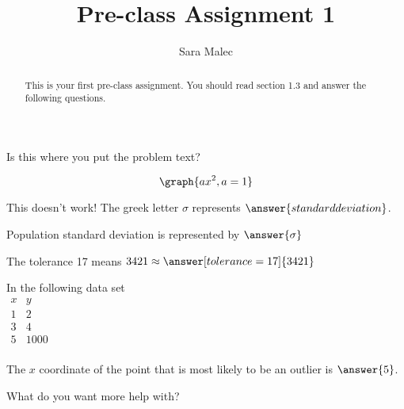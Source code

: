 \documentclass[handout]{ximera}
\title{Pre-class Assignment 1}
\author{Sara Malec}
\begin{document}
\begin{abstract}
  This is your first pre-class assignment. You should read section 1.3 and answer the following questions.
\end{abstract}
\maketitle


\begin{problem} Is this where you put the problem text?
\begin{multipleChoice}
\end{multipleChoice}
\end{problem}

\begin{problem}
   \[ 
   \graph{ax^2, a=1}
   \]
\end{problem}

\begin{problem}
    This doesn't work! The greek letter $\sigma$ represents $\answer{standard deviation}$.
\end{problem}

\begin{problem}
    Population standard deviation is represented by $\answer{\sigma}$
\end{problem}

\begin{problem}
   The tolerance 17 means $3421 \approx \answer[tolerance=17]{3421}$
\end{problem}

\begin{problem}

    In the following data set\\
    
$\begin{array}{c|c}
    x&y\\
    \hline
    1&2\\
    3&4\\
    5&1000\\
\end{array}$
    
\begin{prompt}
    The $x$ coordinate of the point that is most likely to be an outlier is $\answer{5}$.
\end{prompt}
\end{problem}

\begin{problem}
\begin{freeResponse}
What do you want more help with?
\end{freeResponse}
\end{problem}
\end{document}
